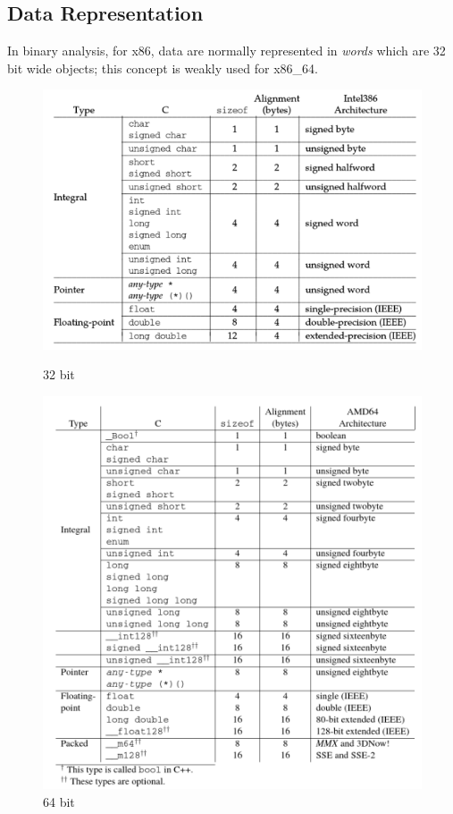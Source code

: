 \subsection{Data Representation}
In binary analysis, for x86, data are normally represented in \textit{words} which are 32 bit wide objects; this concept
is weakly used for x86\_64.
\begin{figure}[!htbp]
    \centering
    \begin{minipage}[t]{4cm}
        \centering
        \includegraphics[scale=0.35]{./pics/i386_data.png}
        \caption{32 bit}
    \end{minipage}
    \hspace{4cm}
    \begin{minipage}[t]{4cm}
        \centering
        \includegraphics[scale=0.35]{./pics/amd64_data.png}
        \caption{64 bit}
    \end{minipage}
\end{figure}

